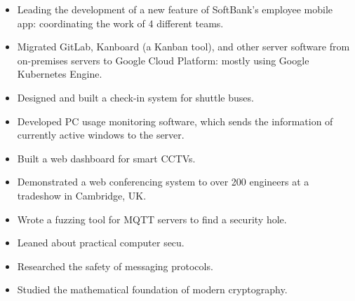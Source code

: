 \documentclass[10pt,a4paper,ragged2e,withhyper]{altacv}
\begin{document}
\begin{paracol}{2}


\begin{itemize}
\item 
  Leading the development of a new feature of SoftBank's employee mobile app: coordinating the work of 4 different teams.

\item
  Migrated GitLab, Kanboard (a Kanban tool), and other server software from on-premises servers to Google Cloud Platform: mostly using Google Kubernetes Engine.

\item
  Designed and built a check-in system for shuttle buses.

\item 
  Developed PC usage monitoring software, which sends the information of currently active windows to the server.

\item
  Built a web dashboard for smart CCTVs.

\item
  Demonstrated a web conferencing system to over 200 engineers at a tradeshow in Cambridge, UK.

\end{itemize}

\divider


\begin{itemize}
  \item Wrote a fuzzing tool for MQTT servers to find a security hole.
  \item Leaned about practical computer secu.
\end{itemize}



\begin{itemize}
  \item Researched the safety of messaging protocols.
  \item Studied the mathematical foundation of modern cryptography.
\end{itemize}


\end{paracol}
\end{document}
